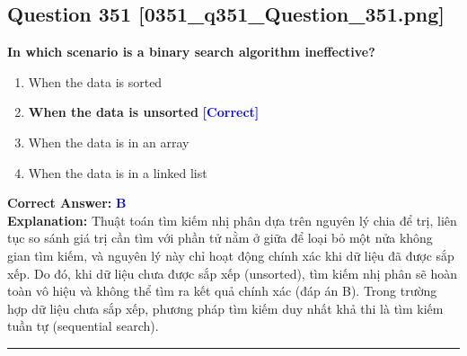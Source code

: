 \documentclass[11pt,a4paper]{article}
\begin{document}
\begin{minipage}{\textwidth}
\subsection*{Question 351 \quad \footnotesize{[0351\_q351\_Question\_351.png]}}
\noindent \textbf{In which scenario is a binary search algorithm ineffective?}

\begin{enumerate}[label=\Alph*.]
    \item When the data is sorted
    \item \textbf{When the data is unsorted} \hfill \textcolor{blue}{\textbf{[Correct]}}
    \item When the data is in an array
    \item When the data is in a linked list
\end{enumerate}

\noindent \textbf{Correct Answer:} \textcolor{blue}{\textbf{B}} \\[2pt]
\noindent \textbf{Explanation:} Thuật toán tìm kiếm nhị phân dựa trên nguyên lý chia để trị, liên tục so sánh giá trị cần tìm với phần tử nằm ở giữa để loại bỏ một nửa không gian tìm kiếm, và nguyên lý này chỉ hoạt động chính xác khi dữ liệu đã được sắp xếp. Do đó, khi dữ liệu chưa được sắp xếp (unsorted), tìm kiếm nhị phân sẽ hoàn toàn vô hiệu và không thể tìm ra kết quả chính xác (đáp án B). Trong trường hợp dữ liệu chưa sắp xếp, phương pháp tìm kiếm duy nhất khả thi là tìm kiếm tuần tự (sequential search).

\par\vspace{0.3cm}
\hrule
\vspace{0.3cm}
\end{minipage}
\end{document}
